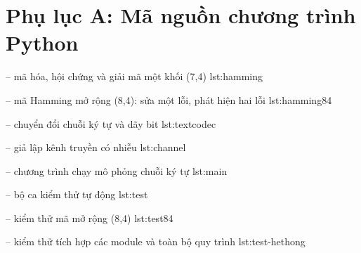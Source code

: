 
{}
\section*{Phụ lục A: Mã nguồn chương trình Python}
\label{phuluc:A}

\renewcommand{\thechuongtrinh}{A.\arabic{chuongtrinh}}
\setcounter{chuongtrinh}{0}

  { -- mã hóa, hội chứng và giải mã một khối (7,4)}
  {lst:hamming}

  { -- mã Hamming mở rộng (8,4): sửa một lỗi, phát hiện hai lỗi}
  {lst:hamming84}

  { -- chuyển đổi chuỗi ký tự và dãy bit}
  {lst:textcodec}

  { -- giả lập kênh truyền có nhiễu}
  {lst:channel}

  { -- chương trình chạy mô phỏng chuỗi ký tự}
  {lst:main}

  { -- bộ ca kiểm thử tự động}
  {lst:test}

  { -- kiểm thử mã mở rộng (8,4)}
  {lst:test84}

  { -- kiểm thử tích hợp các module và toàn bộ quy trình}
  {lst:test-hethong}
